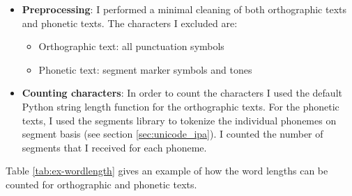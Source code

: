 \begin{description}[style=unboxed]
\begin{itemize}
    \item \textbf{Preprocessing}: I performed a minimal cleaning of both orthographic texts and phonetic texts. The characters I excluded are:
    \begin{itemize}
        \item Orthographic text: all punctuation symbols
        \item Phonetic text: segment marker symbols and tones
    \end{itemize}
    \item \textbf{Counting characters}: In order to count the characters I used the default Python string length function for the orthographic texts. For the phonetic texts, I used the segments library to tokenize the individual phonemes on segment basis (see section \ref{sec:unicode_ipa}).  I counted the number of segments that I received for each phoneme. 
\end{itemize}
Table \ref{tab:ex-wordlength} gives an example of how the word lengths can be counted for orthographic and phonetic texts.


\end{description}

